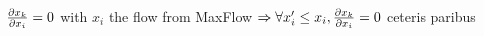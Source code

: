 \begin{theorem} \ \\
   \label{independence}
   ${\partial x_k \over \partial x_i} = 0$ with $x_i$ the flow from MaxFlow $\Rightarrow
     \forall x_i' \leq x_i, {\partial x_k \over \partial x_i} = 0$ ceteris paribus
\end{theorem}
